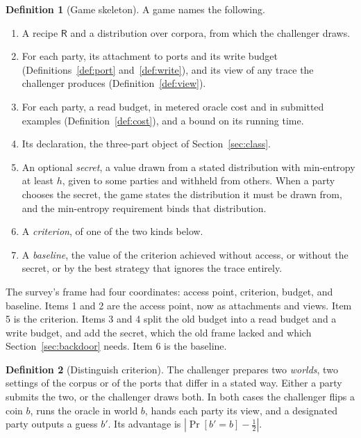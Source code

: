 \documentclass[11pt]{article}
\theoremstyle{definition}
\newtheorem{definition}{Definition}
\theoremstyle{plain}
\theoremstyle{remark}
\newcommand{\Rec}{\mathsf{R}}
\begin{document}
\begin{definition}[Game skeleton]
\label{def:skeleton}
A game names the following.
\begin{enumerate}
  \item A recipe $\Rec$ and a distribution over corpora, from which the challenger
        draws.
  \item For each party, its attachment to ports and its write budget
        (Definitions~\ref{def:port} and~\ref{def:write}), and its view of any trace
        the challenger produces (Definition~\ref{def:view}).
  \item For each party, a read budget, in metered oracle cost and in submitted
        examples (Definition~\ref{def:cost}), and a bound on its running time.
  \item Its declaration, the three-part object of Section~\ref{sec:class}.
  \item An optional \emph{secret}, a value drawn from a stated distribution with
        min-entropy at least $h$, given to some parties and withheld from others.
        When a party chooses the secret, the game states the distribution it must
        be drawn from, and the min-entropy requirement binds that distribution.
  \item A \emph{criterion}, of one of the two kinds below.
  \item A \emph{baseline}, the value of the criterion achieved without access, or
        without the secret, or by the best strategy that ignores the trace
        entirely.
\end{enumerate}
\end{definition}

The survey's frame had four coordinates: access point, criterion, budget, and
baseline. Items 1 and 2 are the access point, now as attachments and views. Item 5
is the criterion. Items 3 and 4 split the old budget into a read budget and a write
budget, and add the secret, which the old frame lacked and which
Section~\ref{sec:backdoor} needs. Item 6 is the baseline.

\begin{definition}[Distinguish criterion]
\label{def:dist}
The challenger prepares two \emph{worlds}, two settings of the corpus or of the
ports that differ in a stated way. Either a party submits the two, or the challenger draws both. In both cases the
challenger flips a coin $b$, runs the oracle in world $b$, hands each party its
view, and a designated party outputs a guess $b'$. Its advantage is $|\Pr[b'=b]-\tfrac12|$.
\end{definition}
\end{document}
